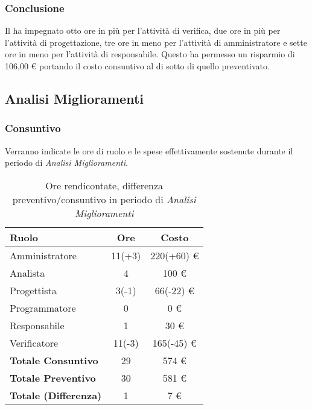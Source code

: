 \subsubsection{Conclusione}
Il  ha impegnato otto ore in pi\`u per l'attivit\`a di verifica, due ore in pi\`u per l'attivit\`a di progettazione, tre ore in meno per l'attivit\`a di amministratore e sette ore in meno per l'attivit\`a di responsabile. Questo ha permesso un risparmio di 106,00 \euro{} portando il costo consuntivo al di sotto di quello preventivato.

\newpage


\subsection{Analisi Miglioramenti}
\subsubsection{Consuntivo}
Verranno indicate le ore di ruolo e le spese effettivamente sostenute durante il periodo di \textit{Analisi Miglioramenti}.

\begin{table}[H]
	\centering
	\begin{tabular}{ l c c }
		\textbf{Ruolo} & \textbf{Ore} & \textbf{Costo} \\
		\hline
		Amministratore & 11(+3) & 220(+60) \euro{} \\
		Analista & 4 & 100 \euro{} \\
		Progettista & 3(-1) & 66(-22) \euro{} \\
		Programmatore & 0 & 0 \euro{} \\
		Responsabile & 1 & 30 \euro{} \\
		Verificatore & 11(-3) & 165(-45) \euro{} \\
		\hline
		\textbf{Totale Consuntivo} & 29 & 574 \euro{} \\
		\hline
		\textbf{Totale Preventivo} & 30 & 581 \euro{} \\
		\hline
		\textbf{Totale (Differenza)} & 1 & 7 \euro{} \\
		\hline
	\end{tabular}
	\caption{Ore rendicontate, differenza preventivo/consuntivo in periodo di \textit{Analisi Miglioramenti}}
\end{table}



